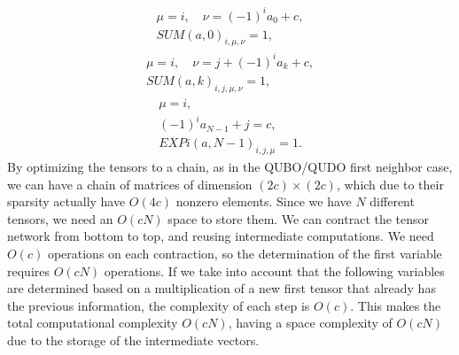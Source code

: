 \begin{equation}
     \begin{gathered}
         \mu=i,\quad \nu=(-1)^i a_0+c,\\
         SUM(a,0)_{i,\mu,\nu} = 1,
     \end{gathered}
\end{equation}
\begin{equation}
     \begin{gathered}
         \mu=i,\quad \nu=j+(-1)^i a_k+c,\\
         SUM(a,k)_{i,j,\mu,\nu} = 1,
     \end{gathered}
\end{equation}
\begin{equation}
     \begin{gathered}
         \mu=i,\\
         (-1)^i a_{N-1} + j = c,\\
         EXPi(a,N-1)_{i,j,\mu} = 1.
     \end{gathered}
\end{equation}
By optimizing the tensors to a chain, as in the QUBO/QUDO first neighbor case, we can have a chain of matrices of dimension $(2c)\times (2c)$, which due to their sparsity actually have $O(4c)$ nonzero elements. Since we have $N$ different tensors, we need an $O(cN)$ space to store them. We can contract the tensor network from bottom to top, and reusing intermediate computations. We need $O(c)$ operations on each contraction, so the determination of the first variable requires $O(cN)$ operations. If we take into account that the following variables are determined based on a multiplication of a new first tensor that already has the previous information, the complexity of each step is $O(c)$. This makes the total computational complexity $O(cN)$, having a space complexity of $O(cN)$ due to the storage of the intermediate vectors.




















